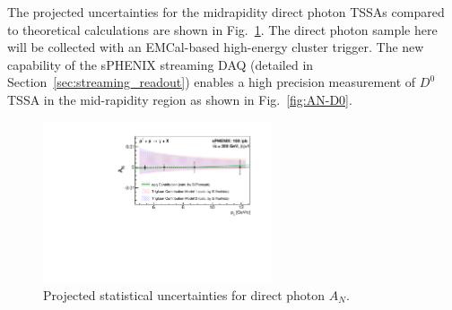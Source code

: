 The projected uncertainties for the midrapidity direct photon TSSAs compared to theoretical calculations are shown in Fig.~\ref{fig:AN_dp}. The direct photon sample here will be collected with an EMCal-based high-energy cluster trigger. 
The new capability of the sPHENIX streaming DAQ (detailed in
Section~\ref{sec:streaming_readout}) enables a high precision
measurement of $D^0$ TSSA in the mid-rapidity region as shown in
Fig.~\ref{fig:AN-D0}.  

\begin{figure}[htbp]
\centering
\includegraphics[width=0.60\textwidth]{figs/AN_dp_sphenix.pdf}
\caption{Projected statistical uncertainties for direct photon $A_N$.}
\label{fig:AN_dp}
\end{figure}


